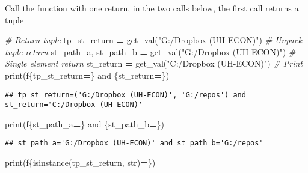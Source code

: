 \documentclass[
]{book}
\newenvironment{Shaded}{\begin{snugshade}}{\end{snugshade}}
\newcommand{\BuiltInTok}[1]{#1}
\newcommand{\CommentTok}[1]{\textcolor[rgb]{0.56,0.35,0.01}{\textit{#1}}}
\newcommand{\NormalTok}[1]{#1}
\newcommand{\OperatorTok}[1]{\textcolor[rgb]{0.81,0.36,0.00}{\textbf{#1}}}
\newcommand{\SpecialCharTok}[1]{\textcolor[rgb]{0.00,0.00,0.00}{#1}}
\newcommand{\SpecialStringTok}[1]{\textcolor[rgb]{0.31,0.60,0.02}{#1}}
\newcommand{\StringTok}[1]{\textcolor[rgb]{0.31,0.60,0.02}{#1}}
\begin{document}
Call the function with one return, in the two calls below, the first call returns a tuple

\begin{Shaded}
\begin{Highlighting}[]
\CommentTok{\# Return tuple}
\NormalTok{tp\_st\_return }\OperatorTok{=}\NormalTok{ get\_val(}\StringTok{"G:/Dropbox (UH{-}ECON)"}\NormalTok{)}
\CommentTok{\# Unpack tuple return}
\NormalTok{st\_path\_a, st\_path\_b }\OperatorTok{=}\NormalTok{ get\_val(}\StringTok{"G:/Dropbox (UH{-}ECON)"}\NormalTok{)}
\CommentTok{\# Single element return}
\NormalTok{st\_return }\OperatorTok{=}\NormalTok{ get\_val(}\StringTok{"C:/Dropbox (UH{-}ECON)"}\NormalTok{)}
\CommentTok{\# Print}
\BuiltInTok{print}\NormalTok{(}\SpecialStringTok{f\textquotesingle{}}\SpecialCharTok{\{}\NormalTok{tp\_st\_return}\OperatorTok{=}\SpecialCharTok{\}}\SpecialStringTok{ and }\SpecialCharTok{\{}\NormalTok{st\_return}\OperatorTok{=}\SpecialCharTok{\}}\SpecialStringTok{\textquotesingle{}}\NormalTok{)}
\end{Highlighting}
\end{Shaded}

\begin{verbatim}
## tp_st_return=('G:/Dropbox (UH-ECON)', 'G:/repos') and st_return='C:/Dropbox (UH-ECON)'
\end{verbatim}

\begin{Shaded}
\begin{Highlighting}[]
\BuiltInTok{print}\NormalTok{(}\SpecialStringTok{f\textquotesingle{}}\SpecialCharTok{\{}\NormalTok{st\_path\_a}\OperatorTok{=}\SpecialCharTok{\}}\SpecialStringTok{ and }\SpecialCharTok{\{}\NormalTok{st\_path\_b}\OperatorTok{=}\SpecialCharTok{\}}\SpecialStringTok{\textquotesingle{}}\NormalTok{)}
\end{Highlighting}
\end{Shaded}

\begin{verbatim}
## st_path_a='G:/Dropbox (UH-ECON)' and st_path_b='G:/repos'
\end{verbatim}

\begin{Shaded}
\begin{Highlighting}[]
\BuiltInTok{print}\NormalTok{(}\SpecialStringTok{f\textquotesingle{}}\SpecialCharTok{\{}\BuiltInTok{isinstance}\NormalTok{(tp\_st\_return, }\BuiltInTok{str}\NormalTok{)}\OperatorTok{=}\SpecialCharTok{\}}\SpecialStringTok{\textquotesingle{}}\NormalTok{)}
\end{Highlighting}
\end{Shaded}
\end{document}

